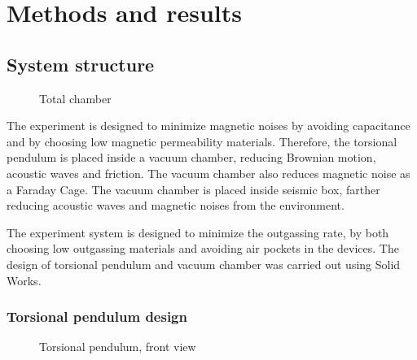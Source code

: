 \documentclass[\main/master.tex]{subfiles}
\begin{document}
\chapter{Methods and results}\label{chapter:Methods and results}

\section{System structure}
\begin{figure}[htbp]
	\centering
	\caption[Total chamber]{Total chamber}
	\label{fig:Total chamber}
\end{figure}
\FloatBarrier
\par\noindent
The experiment is designed to minimize magnetic noises by avoiding capacitance and by choosing low magnetic permeability materials. Therefore, the torsional pendulum is placed inside a vacuum chamber, reducing Brownian motion, acoustic waves and friction. The vacuum chamber also reduces magnetic noise as a Faraday Cage. The vacuum chamber is placed inside seismic box, farther reducing acoustic waves and magnetic noises from the environment.

\par\noindent
The experiment system is designed to minimize the outgassing rate, by both choosing low outgassing materials and avoiding air pockets in the devices. The design of torsional pendulum and vacuum chamber was carried out using Solid Works.

\subsection{Torsional pendulum design}
\begin{figure}[htbp]
	\centering
	\caption[Torsional pendulum, front view]{Torsional pendulum, front view}
	\label{fig:pendulum front}
\end{figure}
\FloatBarrier
\end{document}
